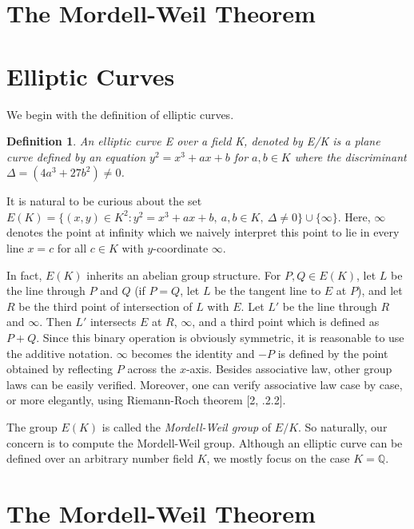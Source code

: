 \documentclass[12pt]{article}
\newcommand{\<}{\langle}
\renewcommand{\>}{\rangle}
\numberwithin{equation}{section}
\theoremstyle{plain}
\newtheorem{defn}[thm]{Definition}
\theoremstyle{definition}
\begin{document}

\section*{The Mordell-Weil Theorem}

\section{Elliptic Curves}

We begin with the definition of elliptic curves.

\begin{defn}
    An elliptic curve E over a field K, denoted by E/K is a plane curve defined by an equation \(y^2=x^3+ax+b\) for \(a, b \in K\) where the discriminant \( \Delta = (4a^3+27b^2) \ne 0 \).
\end{defn}

It is natural to be curious about the set \(E(K) = \{ (x,y) \in K^2 : y^2 = x^3 + ax + b, \: a, b \in K, \: \Delta \ne 0\} \cup \{ \infty \} \). Here, \( \infty \) denotes the point at infinity which we naively interpret this point to lie in every line \(x=c\) for all \( c \in K \) with \(y\)-coordinate \(\infty\).

In fact, \( E(K) \) inherits an abelian group structure. For \(P,Q \in E(K)\), let \(L\) be the line through \(P\) and \(Q\) (if \(P=Q\), let \(L\) be the tangent line to \(E\) at \(P\)), and let \(R\) be the third point of intersection of \(L\) with \(E\). Let \(L'\) be the line through \(R\) and \(\infty\). Then \(L'\) intersects \(E\) at \(R\), \(\infty\), and a third point which is defined as \(P+Q\). Since this binary operation is obviously symmetric, it is reasonable to use the additive notation. \( \infty\) becomes the identity and \(-P\) is defined by the point obtained by reflecting \(P\) across the \(x\)-axis. Besides associative law, other group laws can be easily verified. Moreover, one can verify associative law case by case, or more elegantly, using Riemann-Roch theorem [2, .2.2].

The group \(E(K)\) is called the \textit{Mordell-Weil group} of \(E/K\). So naturally, our concern is to compute the Mordell-Weil group. Although an elliptic curve can be defined over an arbitrary number field \(K\), we mostly focus on the case \(K=\mathbb{Q}\).

\section{The Mordell-Weil Theorem}
\end{document}

